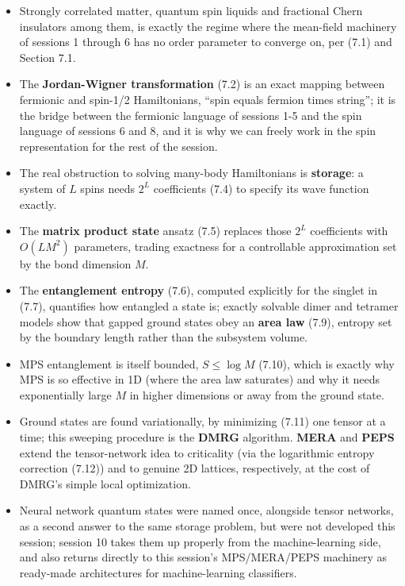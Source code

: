 \begin{itemize}
\item Strongly correlated matter, quantum spin liquids and fractional Chern insulators among them, is
  exactly the regime where the mean-field machinery of sessions 1 through 6 has no order parameter to
  converge on, per (7.1) and Section 7.1.
\item The \textbf{Jordan-Wigner transformation} (7.2) is an exact mapping between fermionic and spin-1/2
  Hamiltonians, ``spin equals fermion times string''; it is the bridge between the fermionic language of
  sessions 1-5 and the spin language of sessions 6 and 8, and it is why we can freely work in the spin
  representation for the rest of the session.
\item The real obstruction to solving many-body Hamiltonians is \textbf{storage}: a system of $L$ spins needs
  $2^L$ coefficients (7.4) to specify its wave function exactly.
\item The \textbf{matrix product state} ansatz (7.5) replaces those $2^L$ coefficients with $O(LM^2)$
  parameters, trading exactness for a controllable approximation set by the bond dimension $M$.
\item The \textbf{entanglement entropy} (7.6), computed explicitly for the singlet in (7.7), quantifies how
  entangled a state is; exactly solvable dimer and tetramer models show that gapped ground states obey
  an \textbf{area law} (7.9), entropy set by the boundary length rather than the subsystem volume.
\item MPS entanglement is itself bounded, $S \le \log M$ (7.10), which is exactly why MPS is so effective in
  1D (where the area law saturates) and why it needs exponentially large $M$ in higher dimensions or
  away from the ground state.
\item Ground states are found variationally, by minimizing (7.11) one tensor at a time; this sweeping
  procedure is the \textbf{DMRG} algorithm. \textbf{MERA} and \textbf{PEPS} extend the tensor-network idea to
  criticality (via the logarithmic entropy correction (7.12)) and to genuine 2D lattices, respectively,
  at the cost of DMRG's simple local optimization.
\item Neural network quantum states were named once, alongside tensor networks, as a second answer to the
  same storage problem, but were not developed this session; session 10 takes them up properly from the
  machine-learning side, and also returns directly to this session's MPS/MERA/PEPS machinery as
  ready-made architectures for machine-learning classifiers.
\end{itemize}
